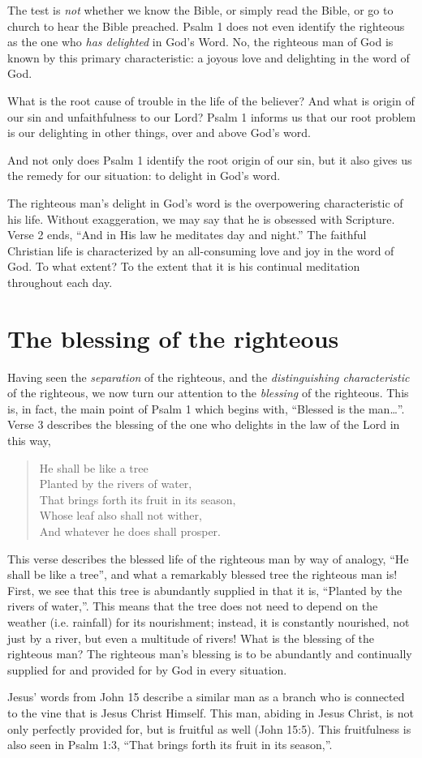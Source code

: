 \documentclass[a5paper]{book}
\newcommand{\Q}[1]{\begin{quote}#1\end{quote}}
\begin{document}
The test is \emph{not} whether we know the Bible,
    or simply read the Bible,
    or go to church to hear the Bible preached.
Psalm 1 does not even identify the righteous as the one
    who \emph{has delighted} in God's Word.
No, the righteous man of God is known by this primary characteristic:
    a joyous love and delighting in the word of God.

What is the root cause of trouble in the life of the believer?
And what is origin of our sin and unfaithfulness to our Lord?
Psalm 1 informs us that our root problem is our delighting in other things,
    over and above God's word.

And not only does Psalm 1 identify the root origin of our sin,
    but it also gives us the remedy for our situation:
    to delight in God's word.

The righteous man's delight in God's word is the overpowering characteristic
    of his life.
Without exaggeration, we may say that he is obsessed with Scripture.
Verse 2 ends, ``And in His law he meditates day and night.''
The faithful Christian life is characterized by
    an all-consuming love and joy in the word of God.
To what extent?
To the extent that it is his continual meditation throughout each day.
    
\section{The blessing of the righteous}
Having seen the \emph{separation} of the righteous,
    and the \emph{distinguishing characteristic} of the righteous,
    we now turn our attention to the \emph{blessing} of the righteous.
This is, in fact, the main point of Psalm 1 which begins with, 
    ``Blessed is the man\ldots''.
Verse 3 describes the blessing of the one who delights in the law of the Lord 
    in this way,
    \Q{He shall be like a tree \\
    Planted by the rivers of water, \\
    That brings forth its fruit in its season, \\
    Whose leaf also shall not wither, \\
    And whatever he does shall prosper.}

This verse describes the blessed life of the righteous man by way of analogy,
    ``He shall be like a tree'',
    and what a remarkably blessed tree the righteous man is!
First, we see that this tree is abundantly supplied
    in that it is, ``Planted by the rivers of water,''.
This means that the tree does not need to depend on the weather (i.e. rainfall)
    for its nourishment;
    instead, it is constantly nourished,
    not just by a river,
    but even a multitude of rivers!
What is the blessing of the righteous man?
The righteous man's blessing is to be abundantly and continually supplied for
    and provided for by God in every situation.

Jesus' words from John 15 describe a similar man
    as a branch who is connected to the vine that is Jesus Christ Himself.
This man, abiding in Jesus Christ, is not only perfectly provided for, 
    but is fruitful as well (John 15:5).
This fruitfulness is also seen in Psalm 1:3, 
    ``That brings forth its fruit in its season,''.
\end{document}
